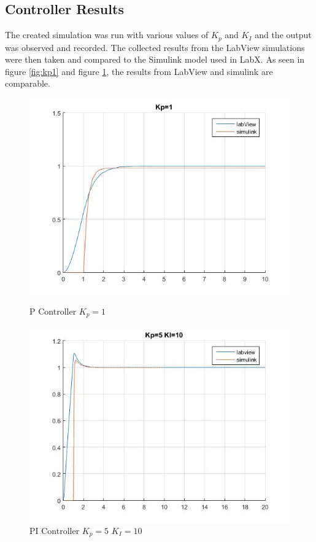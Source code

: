 \documentclass[11pt,titlepage]{article}
\begin{document}
	\subsection{Controller Results}
		The created simulation was run with various values of $K_p$ and $K_I$ and the output was observed and recorded. The collected results from the LabView simulations were then taken and compared to the Simulink model used in LabX. As seen in figure \ref{fig:kp1} and figure \ref{fig:kp5KI10}, the results from LabView and simulink are comparable.
		\begin{figure}[h!]
			\centering
			\begin{minipage}{.5\textwidth}
				\centering
				\includegraphics[scale=.4]{Kp1}
				\caption{P Controller $K_p=1$}
				\label{fig:kp1}
			\end{minipage}%
			\begin{minipage}{.5\textwidth}
				\centering
				\includegraphics[scale=.4]{Kp5KI10}
				\caption{PI Controller $K_p=5$ $K_I=10$}
				\label{fig:kp5KI10}
			\end{minipage}%
		\end{figure}	
\end{document}
